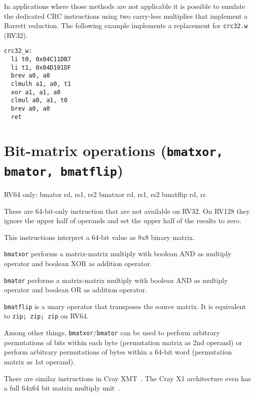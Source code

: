 In applications where those methods are not applicable it is possible to emulate the dedicated CRC
instructions using two carry-less multiplies that implement a Barrett reduction. The following example
implements a replacement for \texttt{crc32.w} (RV32).

\begin{minipage}{\linewidth}
\begin{verbatim}
crc32_w:
  li t0, 0x04C11DB7
  li t1, 0x04D101DF
  brev a0, a0
  clmulh a1, a0, t1
  xor a1, a1, a0
  clmul a0, a1, t0
  brev a0, a0
  ret
\end{verbatim}
\end{minipage}


\section{Bit-matrix operations (\texttt{bmatxor, bmator, bmatflip})}

\begin{rvb}
  RV64 only:
    bmator rd, rs1, rs2
    bmatxor rd, rs1, rs2
    bmatflip rd, rs
\end{rvb}

These are 64-bit-only instruction that are not available on RV32. On RV128 they
ignore the upper half of operands and set the upper half of the results to zero.

This instructions interpret a 64-bit value as 8x8 binary matrix.

\texttt{bmatxor} performs a matrix-matrix multiply with boolean AND as multiply
operator and boolean XOR as addition operator.

\texttt{bmator} performs a matrix-matrix multiply with boolean AND as multiply
operator and boolean OR as addition operator.

\texttt{bmatflip} is a unary operator that transposes the source matrix. It is
equivalent to \texttt{zip; zip; zip} on RV64.

Among other things, \texttt{bmatxor}/\texttt{bmator} can be used to perform
arbitrary permutations of bits within each byte (permutation matrix as 2nd
operand) or perform arbitrary permutations of bytes within a 64-bit word
(permutation matrix as 1st operand).

There are similar instructions in Cray XMT~\cite{CrayXMT}. The Cray X1
architecture even has a full 64x64 bit matrix multiply unit~\cite{CrayX1}.

